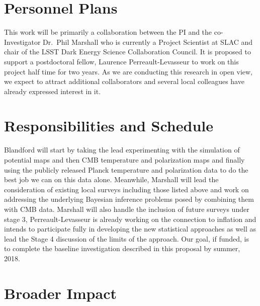 \documentclass[psfig,11pt]{article}
\begin{document}
{%

\section{Personnel Plans}

This work will be primarily a collaboration between the PI and the co-Investigator Dr.\ Phil Marshall who is currently a Project Scientist at SLAC and chair of the LSST Dark Energy Science Collaboration Council. It is proposed to support a postdoctoral fellow, Laurence Perreault-Levasseur to work on this project half time for two years. As we are conducting this research in open view, we expect to attract additional collaborators and several local colleagues have already expressed interest in it.


\section{Responsibilities and Schedule}

Blandford will start by taking the lead experimenting with the simulation of potential maps and then CMB temperature and polarization maps and finally using the publicly released Planck temperature and polarization data to do the best job we can on this data alone. Meanwhile, Marshall will lead the consideration of existing local surveys including those listed above and work on addressing the underlying Bayesian inference problems posed by combining them with CMB data. Marshall will also handle the inclusion of future surveys under stage 3, Perreault-Levasseur is already working on the connection to inflation and intends to participate fully in developing the new statistical approaches as well as lead the Stage 4 discussion of the limits of the approach. Our goal, if funded, is to complete the baseline investigation described in this proposal by summer, 2018.


\section{Broader Impact}

}
\end{document}
